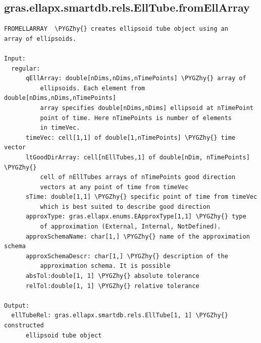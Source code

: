 \documentclass[letterpaper,10pt,english]{sphinxmanual}
\def\PYGZhy{\char`\-}
\begin{document}
\subsection{gras.ellapx.smartdb.rels.EllTube.fromEllArray}
\label{chap_functions:gras-ellapx-smartdb-rels-elltube-fromellarray}
\begin{Verbatim}[commandchars=\\\{\}]
FROMELLARRAY  \PYGZhy{} creates ellipsoid tube object using an
array of ellipsoids.

Input:
  regular:
      qEllArray: double[nDims,nDims,nTimePoints] \PYGZhy{} array of
          ellipsoids. Each element from double[nDims,nDims,nTimePoints]
          array specifies double[nDims,nDims] ellipsoid at nTimePoint
          point of time. Here nTimePoints is number of elements
          in timeVec.
      timeVec: cell[1,1] of double[1,nTimePoints] \PYGZhy{} time vector
      ltGoodDirArray: cell[nEllTubes,1] of double[nDim, nTimePoints] \PYGZhy{}
          cell of nEllTubes arrays of nTimePoints good direction
          vectors at any point of time from timeVec
      sTime: double[1,1] \PYGZhy{} specific point of time from timeVec
          which is best suited to describe good direction
      approxType: gras.ellapx.enums.EApproxType[1,1] \PYGZhy{} type
          of approximation (External, Internal, NotDefined).
      approxSchemaName: char[1,] \PYGZhy{} name of the approximation schema
      approxSchemaDescr: char[1,] \PYGZhy{} description of the
          approximation schema. It is possible
      absTol:double[1, 1] \PYGZhy{} absolute tolerance
      relTol:double[1, 1] \PYGZhy{} relative tolerance

Output:
  ellTubeRel: gras.ellapx.smartdb.rels.EllTube[1, 1] \PYGZhy{} constructed
      ellipsoid tube object
\end{Verbatim}
\end{document}
